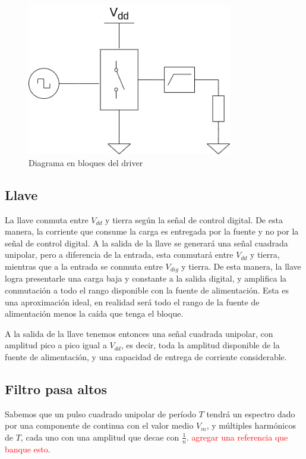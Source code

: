 \begin{figure}[tbp]
    \centering
    \includegraphics[width=0.8\textwidth]{images/driver.drawio.png}
    \caption{Diagrama en bloques del driver}
    \label{fig:driver_block_diagram}
\end{figure}

\subsection{Llave}

La llave conmuta entre $V_{dd}$ y tierra según la señal de control digital. De
esta manera, la corriente que consume la carga es entregada por la fuente y no
por la señal de control digital. A la salida de la llave se generará una señal
cuadrada unipolar, pero a diferencia de la entrada, esta conmutará entre
$V_{dd}$ y tierra, mientras que a la entrada se conmuta entre $V_{dig}$ y
tierra. De esta manera, la llave logra presentarle una carga baja y constante a
la salida digital, y amplifica la conmutación a todo el rango disponible con la
fuente de alimentación. Esta es una aproximación ideal, en realidad será todo el
rango de la fuente de alimentación menos la caída que tenga el bloque.

A la salida de la llave tenemos entonces una señal cuadrada unipolar, con
amplitud pico a pico igual a $V_{dd}$, es decir, toda la amplitud disponible de
la fuente de alimentación, y una capacidad de entrega de corriente considerable.

\subsection{Filtro pasa altos}

Sabemos que un pulso cuadrado unipolar de período $T$ tendrá un espectro dado
por una componente de continua con el valor medio $V_{m}$, y múltiples
harmónicos de $T$, cada uno con una amplitud que decae con $\frac{1}{n}$.
\textcolor{red}{agregar una referencia que banque esto}.

